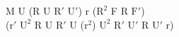 M U (R U $\text{R}'$ $\text{U}'$) r ($\text{R}^2$ F R $\text{F}'$)\\
($\text{r}'$ $\text{U}^2$ R U $\text{R}'$ U ($\text{r}^2$) $\text{U}^2$ $\text{R}'$ $\text{U}'$ R $\text{U}'$ r)\\

